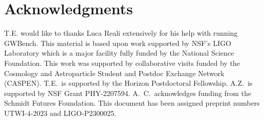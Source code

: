 \documentclass[twocolumn]{aastex631}
\begin{document}
\section{Acknowledgments}
T.E. would like to thanks Luca Reali extensively for his help with running GWBench. This material is based upon work supported by NSF's LIGO Laboratory which is a major facility fully funded by the National Science Foundation.
This work was supported by collaborative visits funded by the Cosmology and Astroparticle Student and Postdoc Exchange Network (CASPEN). 
T.E.\ is supported by the Horizon Postdoctoral Fellowship.
A.Z.~is supported by NSF Grant PHY-2207594.
A.~C.\ acknowledges funding from the Schmidt Futures Foundation.
This document has been assigned preprint numbers UTWI-4-2023 and LIGO-P2300025.


\end{document}
